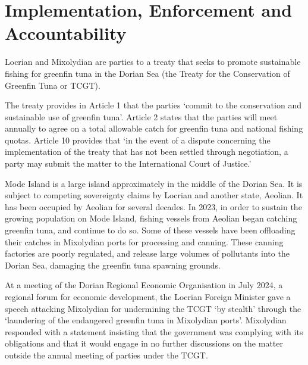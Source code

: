 \section{Implementation, Enforcement and Accountability}
\begin{tutorialquestion}
    \flushleft
    Locrian and Mixolydian are parties to a treaty that seeks to promote sustainable fishing for greenfin tuna in the Dorian Sea (the Treaty for the Conservation of Greenfin Tuna or TCGT).

    \vspace{\baselineskip}

    The treaty provides in Article 1 that the parties `commit to the conservation and sustainable use of greenfin tuna'. Article 2 states that the parties will meet annually to agree on a total allowable catch for greenfin tuna and national fishing quotas. Article 10 provides that `in the event of a dispute concerning the implementation of the treaty that has not been settled through negotiation, a party may submit the matter to the International Court of Justice.'

    \vspace{\baselineskip}

    Mode Island is a large island approximately in the middle of the Dorian Sea. It is subject to competing sovereignty claims by Locrian and another state, Aeolian. It has been occupied by Aeolian for several decades. In 2023, in order to sustain the growing population on Mode Island, fishing vessels from Aeolian began catching greenfin tuna, and continue to do so. Some of these vessels have been offloading their catches in Mixolydian ports for processing and canning. These canning factories are poorly regulated, and release large volumes of pollutants into the Dorian Sea, damaging the greenfin tuna spawning grounds.

    \vspace{\baselineskip}

    At a meeting of the Dorian Regional Economic Organisation in July 2024, a regional forum for economic development, the Locrian Foreign Minister gave a speech attacking Mixolydian for undermining the TCGT `by stealth' through the `laundering of the endangered greenfin tuna in Mixolydian ports'. Mixolydian responded with a statement insisting that the government was complying with its obligations and that it would engage in no further discussions on the matter outside the annual meeting of parties under the TCGT.

    \vspace{\baselineskip}


\end{tutorialquestion}
